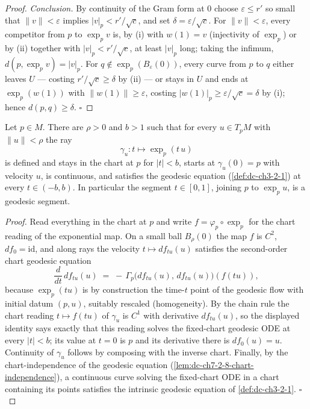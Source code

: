 \begin{proof}
  \emph{Conclusion.} By continuity of the Gram form at $0$ choose
  $\varepsilon\le r'$ so small that $\|v\|<\varepsilon$ implies
  $|v|_p<r'/\sqrt c$, and set $\delta=\varepsilon/\sqrt c$. For
  $\|v\|<\varepsilon$, every competitor from $p$ to $\exp_p v$ is, by (i) with
  $w(1)=v$ (injectivity of $\exp_p$) or by (ii) together with
  $|v|_p<r'/\sqrt c$, at least $|v|_p$ long; taking the infimum,
  $d(p,\exp_p v)=|v|_p$. For $q\notin\exp_p(B_\varepsilon(0))$, every curve
  from $p$ to $q$ either leaves $U$ — costing $r'/\sqrt c\ge\delta$ by (ii) —
  or stays in $U$ and ends at $\exp_p(w(1))$ with $\|w(1)\|\ge\varepsilon$,
  costing $|w(1)|_p\ge\varepsilon/\sqrt c=\delta$ by (i); hence
  $d(p,q)\ge\delta$. $\square$
\end{proof}

\begin{lemma}
  \label{lem:dc-ch7-2-8-ray-geodesic}
  \leanok
  Let $p\in M$. There are $\rho>0$ and $b>1$ such that for every $u\in T_pM$
  with $\|u\|<\rho$ the ray
  $$
  \gamma_u : t \longmapsto \exp_p(t\,u)
  $$
  is defined and stays in the chart at $p$ for $|t|<b$, starts at
  $\gamma_u(0)=p$ with velocity $u$, is continuous, and satisfies the geodesic
  equation (\cref{def:dc-ch3-2-1}) at every $t\in(-b,b)$. In particular the
  segment $t\in[0,1]$, joining $p$ to $\exp_p u$, is a geodesic segment.
\end{lemma}
\begin{proof}
  \leanok
  Read everything in the chart at $p$ and write $f=\varphi_p\circ\exp_p$ for
  the chart reading of the exponential map. On a small ball $B_\rho(0)$ the
  map $f$ is $C^2$, $df_0=\mathrm{id}$, and along rays the velocity
  $t\mapsto df_{tu}(u)$ satisfies the second-order chart geodesic equation
  $$
  \frac{d}{dt}\,df_{tu}(u)\;=\;-\,\Gamma_p\big(df_{tu}(u),\,df_{tu}(u)\big)(f(tu)),
  $$
  because $\exp_p(tu)$ is by construction the time-$t$ point of the geodesic
  flow with initial datum $(p,u)$, suitably rescaled (homogeneity). By the
  chain rule the chart reading $t\mapsto f(tu)$ of $\gamma_u$ is $C^1$ with
  derivative $df_{tu}(u)$, so the displayed identity says exactly that this
  reading solves the fixed-chart geodesic ODE at every $|t|<b$; its value at
  $t=0$ is $p$ and its derivative there is $df_0(u)=u$. Continuity of
  $\gamma_u$ follows by composing with the inverse chart. Finally, by the
  chart-independence of the geodesic equation
  (\cref{lem:dc-ch7-2-8-chart-independence}), a continuous curve solving the
  fixed-chart ODE in a chart containing its points satisfies the intrinsic
  geodesic equation of \cref{def:dc-ch3-2-1}. $\square$
\end{proof}

